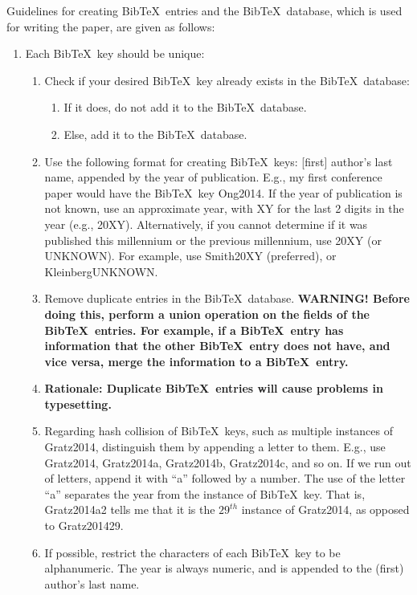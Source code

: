 \documentclass[letter,12pt]{article}
\begin{document}
Guidelines for creating {\sc Bib}\TeX\ entries and the {\sc Bib}\TeX\ database, which is used for writing the paper, are given as follows: \vspace{-0.2cm}
\begin{enumerate} \itemsep -2pt
\item Each {\sc Bib}\TeX\ key should be unique: \vspace{-0.3cm}
	\begin{enumerate} \itemsep -2pt
	\item Check if your desired {\sc Bib}\TeX\ key already exists in the {\sc Bib}\TeX\ database: \vspace{-0.1cm}
		\begin{enumerate} %
		\item If it does, do not add it to the  {\sc Bib}\TeX\ database.
		\item Else, add it to the  {\sc Bib}\TeX\ database.
		\end{enumerate}
	\item Use the following format for creating {\sc Bib}\TeX\ keys: [first] author's last name, appended by the year of publication. E.g., my first conference paper would have the {\sc Bib}\TeX\ key Ong2014. If the year of publication is not known, use an approximate year, with XY for the last 2 digits in the year (e.g., 20XY). Alternatively, if you cannot determine if it was published this millennium or the previous millennium, use 20XY (or UNKNOWN). For example, use Smith20XY (preferred), or KleinbergUNKNOWN.
	\item Remove duplicate entries in the {\sc Bib}\TeX\ database. {\bf WARNING! Before doing this, perform a union operation on the fields of the {\sc Bib}\TeX\ entries. For example, if a {\sc Bib}\TeX\ entry has information that the other {\sc Bib}\TeX\ entry does not have, and vice versa, merge the information to a {\sc Bib}\TeX\ entry.}
	\item {\bf Rationale: Duplicate {\sc Bib}\TeX\ entries will cause problems in typesetting.}
	\item Regarding hash collision of {\sc Bib}\TeX\ keys, such as multiple instances of Gratz2014, distinguish them by appending a letter to them. E.g., use Gratz2014, Gratz2014a, Gratz2014b, Gratz2014c, and so on. If we run out of letters, append it with ``a'' followed by a number. The use of the letter ``a'' separates the year from the instance of {\sc Bib}\TeX\ key. That is, Gratz2014a2 tells me that it is the $29^{th}$ instance of Gratz2014, as opposed to Gratz201429.
	\item If possible, restrict the characters of each {\sc Bib}\TeX\ key to be alphanumeric. The year is always numeric, and is appended to the (first) author's last name. \vspace{-0.2cm}

\end{enumerate}
\end{enumerate}
\end{document}
